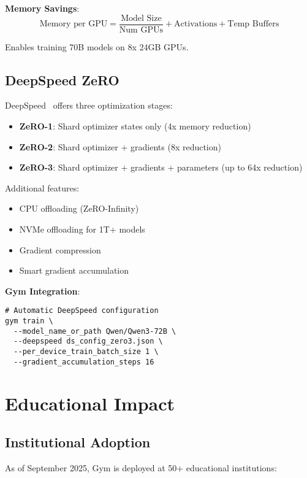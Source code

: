 \documentclass[11pt,letterpaper]{article}
\begin{document}
\textbf{Memory Savings}:
\begin{equation}
\text{Memory per GPU} = \frac{\text{Model Size}}{\text{Num GPUs}} + \text{Activations} + \text{Temp Buffers}
\end{equation}

Enables training 70B models on 8x 24GB GPUs.

\subsection{DeepSpeed ZeRO}

DeepSpeed~\citep{rasley2020deepspeed} offers three optimization stages:

\begin{itemize}
\item \textbf{ZeRO-1}: Shard optimizer states only (4x memory reduction)
\item \textbf{ZeRO-2}: Shard optimizer + gradients (8x reduction)
\item \textbf{ZeRO-3}: Shard optimizer + gradients + parameters (up to 64x reduction)
\end{itemize}

Additional features:
\begin{itemize}
\item CPU offloading (ZeRO-Infinity)
\item NVMe offloading for 1T+ models
\item Gradient compression
\item Smart gradient accumulation
\end{itemize}

\textbf{Gym Integration}:
\begin{verbatim}
# Automatic DeepSpeed configuration
gym train \
  --model_name_or_path Qwen/Qwen3-72B \
  --deepspeed ds_config_zero3.json \
  --per_device_train_batch_size 1 \
  --gradient_accumulation_steps 16
\end{verbatim}

\section{Educational Impact}

\subsection{Institutional Adoption}

As of September 2025, Gym is deployed at 50+ educational institutions:
\end{document}

